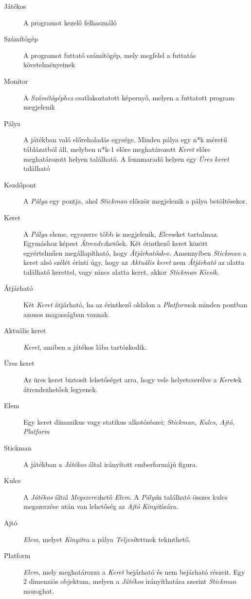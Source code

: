 \begin{description}

    \item[Játékos] A programot kezelő felhasználó
    \item[Számítógép] A programot futtató számítógép, mely megfelel a futtatás követelményeinek
    \item[Monitor] A \emph{Számítógéphez} csatlakoztatott képernyő, melyen a futtatott program megjelenik
    \item[Pálya] A játékban való előrehaladás egysége. Minden pálya egy n*k méretű táblázatból áll, melyben n*k-1 előre meghatározott \emph{Keret} előre meghatározott helyen található. A fennmaradó helyen egy \emph{Üres keret} található
    \item[Kezdőpont] A \emph{Pálya} egy pontja, ahol \emph{Stickman} először megjelenik a pálya betöltésekor.
    \item[Keret] A \emph{Pálya} eleme, egyszerre több is megjelenik, \emph{Elem}eket tartalmaz. Egymáshoz képest \emph{Átrendez}hetőek. Két érintkező keret között egyértelműen megállapítható, hogy \emph{Átjárhatóak}-e. Amennyiben \emph{Stickman} a keret alsó szélét érinti úgy, hogy az \emph{Aktuális keret} nem \emph{Átjárható} az alatta található kerettel, vagy nincs alatta keret, akkor \emph{Stickman} \emph{Kiesik}.
    \item[Átjárható] Két \emph{Keret} átjárható, ha az érintkező oldalon a \emph{Platform}ok minden pontban azonos magasságban vannak.
    \item[Aktuális keret] \emph{Keret}, amiben a játékos lába tartózkodik.
    \item[Üres keret] Az üres keret biztosít lehetőséget arra, hogy vele helyetcserélve a \emph{Keret}ek átrendezhetőek legyenek.
    \item[Elem] Egy keret dinamikus vagy statikus alkotórészei; \emph{Stickman, Kulcs, Ajtó, Platform}
    \item[Stickman] A játékban a \emph{Játékos} által irányított emberformájú figura.
    \item[Kulcs] A \emph{Játékos} által \emph{Megszerez}hető \emph{Elem}. A \emph{Pályá}n található összes kulcs megszerzése után van lehetőség az \emph{Ajtó} \emph{Kinyit}ására.
    \item[Ajtó] \emph{Elem}, melyet \emph{Kinyit}va a pálya \emph{Teljesít}ettnek tekinthető.
    \item[Platform] \emph{Elem}, mely meghatározza a \emph{Keret} bejárható és nem bejárható részeit. Egy 2 dimenziós objektum, melyen a \emph{Játékos} irányíthatása szerint \emph{Stickman} mozoghat.

\end{description}
